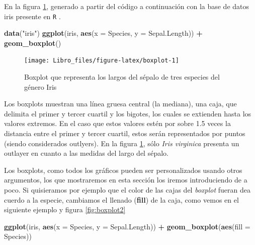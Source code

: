 \documentclass[]{book}
\newenvironment{Shaded}{\begin{snugshade}}{\end{snugshade}}
\newcommand{\DataTypeTok}[1]{\textcolor[rgb]{0.13,0.29,0.53}{#1}}
\newcommand{\KeywordTok}[1]{\textcolor[rgb]{0.13,0.29,0.53}{\textbf{#1}}}
\newcommand{\NormalTok}[1]{#1}
\newcommand{\OperatorTok}[1]{\textcolor[rgb]{0.81,0.36,0.00}{\textbf{#1}}}
\newcommand{\StringTok}[1]{\textcolor[rgb]{0.31,0.60,0.02}{#1}}
\begin{document}
En la figura \ref{fig:boxplot}, generado a partir del código a
continuación con la base de datos iris presente en \texttt{R}
\citep{anderson1935irises}.

\begin{Shaded}
\begin{Highlighting}[]
\KeywordTok{data}\NormalTok{(}\StringTok{"iris"}\NormalTok{)}
\KeywordTok{ggplot}\NormalTok{(iris, }\KeywordTok{aes}\NormalTok{(}\DataTypeTok{x =}\NormalTok{ Species, }\DataTypeTok{y =}\NormalTok{ Sepal.Length)) }\OperatorTok{+}\StringTok{ }\KeywordTok{geom_boxplot}\NormalTok{()}
\end{Highlighting}
\end{Shaded}

\begin{figure}

{\centering \texttt{[image: Libro\_files/figure-latex/boxplot-1]} 

}

\caption{Boxplot que representa los largos del sépalo de tres especies del género Iris}\label{fig:boxplot}
\end{figure}

Los boxplots muestran una línea gruesa central (la mediana), una caja,
que delimita el primer y tercer cuartil y los bigotes, los cuales se
extienden hasta los valores extremos. En el caso que estos valores estén
por sobre 1.5 veces la distancia entre el primer y tercer cuartil, estos
serán representados por puntos (siendo considerados outlyers). En la
figura \ref{fig:boxplot}, sólo \emph{Iris virginica} presenta un
outlayer en cuanto a las medidas del largo del sépalo.

Los boxplots, como todos los gráficos pueden ser personalizados usando
otros argumentos, los que mostraremos en esta sección los iremos
introduciendo de a poco. Si quisieramos por ejemplo que el color de las
cajas del \emph{boxplot} fueran dea cuerdo a la especie, cambiamos el
llenado (\textbf{fill}) de la caja, como vemos en el siguiente ejemplo y
figura \ref{fig:boxplot2}

\begin{Shaded}
\begin{Highlighting}[]
\KeywordTok{ggplot}\NormalTok{(iris, }\KeywordTok{aes}\NormalTok{(}\DataTypeTok{x =}\NormalTok{ Species, }\DataTypeTok{y =}\NormalTok{ Sepal.Length)) }\OperatorTok{+}\StringTok{ }\KeywordTok{geom_boxplot}\NormalTok{(}\KeywordTok{aes}\NormalTok{(}\DataTypeTok{fill =}\NormalTok{ Species))}
\end{Highlighting}
\end{Shaded}
\end{document}
